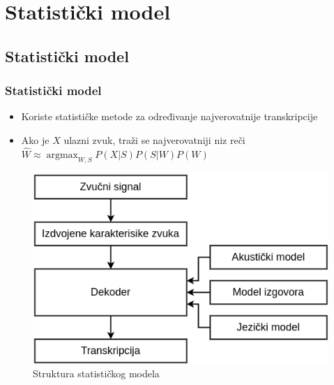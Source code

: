 \documentclass{beamer}
\DeclareMathOperator*{\argmax}{argmax}
\begin{document}
\section{Statistički model}

\subsection{Statistički model}
\begin{frame}
  \frametitle{Statistički model}

  \begin{itemize}
    \item Koriste statističke metode za određivanje najverovatnije transkripcije
    \item Ako je $X$ ulazni zvuk, traži se najverovatniji niz reči $\hat{W} \approx \argmax_{W,S} P(X|S) P(S|W) P(W)$
  \end{itemize}

  \begin{figure}
    \begin{center}
    \includegraphics[scale=0.39]{statistical_model.png}
    \end{center}
    \caption{Struktura statističkog modela}
  \end{figure}
\end{frame}
\end{document}
